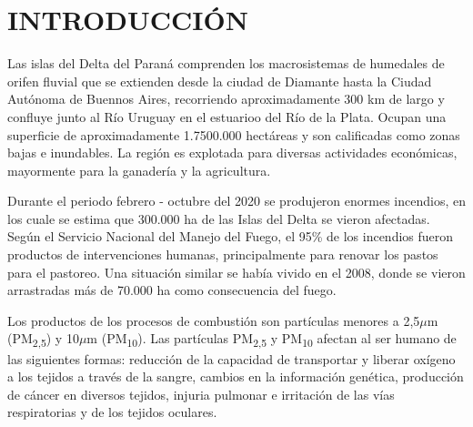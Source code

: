 \documentclass[10pt,twocolumn]{article}
\newcommand\cauthemail[1]{\footnotetext{#1}}
\newcommand{\esresumen}[1]{\small{#1 \par}\vspace{1.5ex}}
\newcommand{\pclaves}[1]{\small{\emph{#1} \par}\vspace{1.5ex}}
\newcommand{\enresumen}[1]{\small{#1 \par}\vspace{1.5ex}}
\newcommand{\keywords}[1]{\small{\emph{#1} \par}\vspace{1.5ex}}
\begin{document}
\renewcommand{\abstractname}{}
\twocolumn[
  \begin{@twocolumnfalse}
    \maketitle
    \begin{abstract}\vspace{-12ex}
      \centering\begin{minipage}{\dimexpr\paperwidth-6cm}

        \esresumen{-}
        \pclaves{-} %

        \enresumen{-}
        \keywords{-}  %

      \end{minipage}
      \vspace{4ex}
    \end{abstract}
  \end{@twocolumnfalse}
]
\thispagestyle{empty}

\setcounter{footnote}{1}
\cauthemail{}  %
\section{INTRODUCCIÓN}

Las islas del Delta del Paraná comprenden los macrosistemas de humedales de orifen fluvial que se extienden desde la ciudad de Diamante hasta la Ciudad Autónoma de Buennos Aires, recorriendo aproximadamente 300 km de largo y confluye junto al Río Uruguay en el estuarioo del Río de la Plata. Ocupan una superficie de aproximadamente 1.7500.000 hectáreas y son calificadas como zonas bajas e inundables.\cite{acuario_del_rio_parana} La región es explotada para diversas actividades económicas, mayormente para la ganadería y la agricultura. \cite{Galperin_2013}

Durante el periodo febrero - octubre del 2020 se produjeron enormes incendios, en los cuale se estima que 300.000 ha de las Islas del Delta se vieron afectadas.\cite{pagina_12} Según el Servicio Nacional del Manejo del Fuego, el 95\% de los incendios fueron productos de intervenciones humanas, principalmente para renovar los pastos para el pastoreo.\cite{SNMF_2020} Una situación similar se había vivido en el 2008, donde se vieron arrastradas más de 70.000 ha como consecuencia del fuego.\cite{quemas_2008}

Los productos de los procesos de combustión son partículas menores a 2,5$\mu$m (PM\textsubscript{2,5}) y 10$\mu$m (PM\textsubscript{10}). Las partículas PM\textsubscript{2,5} y PM\textsubscript{10} afectan al ser humano de las siguientes formas: reducción de la capacidad de transportar y liberar oxígeno a los tejidos a través de la sangre, cambios en la información genética, producción de cáncer en diversos tejidos, injuria pulmonar e irritación de las vías respiratorias y de los tejidos oculares.\cite{molinas_2020}
\end{document}
